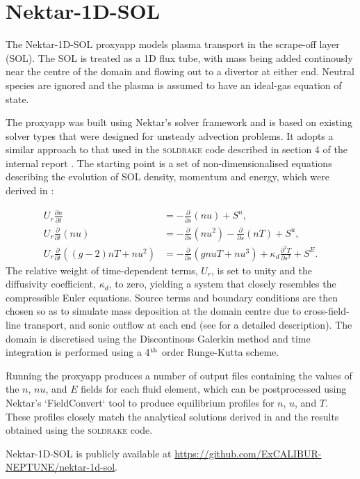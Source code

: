 \section{Nektar-1D-SOL}

The Nektar-1D-SOL proxyapp models plasma transport in the scrape-off layer (SOL).
The SOL is treated as a 1D flux tube, with mass being added continously near the centre of the domain and flowing out to a divertor at either end.
Neutral species are ignored and the plasma is assumed to have an ideal-gas equation of state.

The proxyapp was built using Nektar's solver framework and is based on existing solver types that were designed for unsteady advection problems.
It adopts a similar approach to that used in the \textsc{soldrake} code described in section 4 of the internal report \cite{y3re222}.
The starting point is a set of non-dimensionalised equations describing the evolution of SOL density, momentum and energy, which were derived in \cite{detach-rp2}:

\begin{align}
    U_r \frac{\partial n}{\partial t} &= 
        - \frac{\partial }{\partial s}(nu)
        + S^n, \label{eqn:n}\\
    U_r \frac{\partial }{\partial t} (nu)&= 
        - \frac{\partial }{\partial s} (nu^2)
        - \frac{\partial }{\partial s} (nT)
        + S^u, \label{eqn:u} \\
    U_r \frac{\partial }{\partial t} \left( (g-2)nT + nu^2  \right) &= 
        - \frac{\partial }{\partial s}(gnuT + nu^3)
        + \kappa_d \frac{\partial^2  T}{\partial s^2}
        + S^E. \label{eqn:T}
\end{align}
The relative weight of time-dependent terms, $U_r$, is set to unity and the diffusivity coefficient, $\kappa_d$, to zero, yielding a system that closely resembles the compressible Euler equations.
Source terms and boundary conditions are then chosen so as to simulate mass deposition at the domain centre due to cross-field-line transport, and sonic outflow at each end (see \cite{y3re222} for a detailed description).
The domain is discretised using the Discontinous Galerkin method and time integration is performed using a 4$^{\rm th}$ order Runge-Kutta scheme.

Running the proxyapp produces a number of output files containing the values of the $n$, $nu$, and $E$ fields for each fluid element, which can be postprocessed using Nektar's `FieldConvert` tool to produce equilibrium profiles for $n$, $u$, and $T$.
These profiles closely match the analytical solutions derived in \cite{detach-rp2} and the results obtained using the \textsc{soldrake} code.

Nektar-1D-SOL is publicly available at \url{https://github.com/ExCALIBUR-NEPTUNE/nektar-1d-sol}.